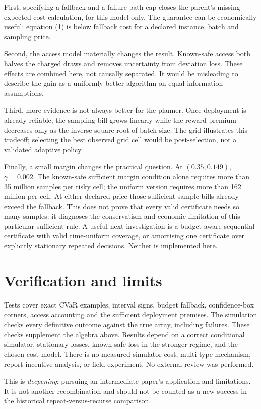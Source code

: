 \documentclass[11pt,a4paper]{article}
\begin{document}
First, specifying a fallback and a failure-path cap closes the parent's
missing expected-cost calculation, for this model only. The guarantee can
be economically useful: equation (1) is below fallback cost for a declared
instance, batch and sampling price.

Second, the access model materially changes the result. Known-safe access
both halves the charged draws and removes uncertainty from deviation loss.
These effects are combined here, not causally separated. It would be
misleading to describe the gain as a uniformly better algorithm on equal
information assumptions.

Third, more evidence is not always better for the planner. Once deployment
is already reliable, the sampling bill grows linearly while the reward
premium decreases only as the inverse square root of batch size. The grid
illustrates this tradeoff; selecting the best observed grid cell would be
post-selection, not a validated adaptive policy.

Finally, a small margin changes the practical question. At
\((0.35,0.149)\), \(\gamma=0.002\). The known-safe sufficient margin
condition alone requires more than 35 million samples per risky cell;
the uniform version requires more than 162 million per cell. At either
declared price those sufficient sample bills already exceed the fallback.
This does not prove that every valid certificate needs so many samples:
it diagnoses the conservatism and economic limitation of this particular
sufficient rule. A useful next investigation is a budget-aware sequential
certificate with valid time-uniform coverage, or amortising one certificate
over explicitly stationary repeated decisions. Neither is implemented here.

\section{Verification and limits}

Tests cover exact CVaR examples, interval signs, budget fallback,
confidence-box corners, access accounting and the sufficient deployment
premises. The simulation checks every definitive outcome against the true
array, including failures. These checks supplement the algebra above.
Results depend on a correct conditional simulator, stationary losses, known
safe loss in the stronger regime, and the chosen cost model. There is no
measured simulator cost, multi-type mechanism, report incentive analysis,
or field experiment. No external review was performed.

This is \emph{deepening}: pursuing an intermediate paper's application and
limitations. It is not another recombination and should not be counted as
a new success in the historical repeat-versus-recurse comparison.
\end{document}

